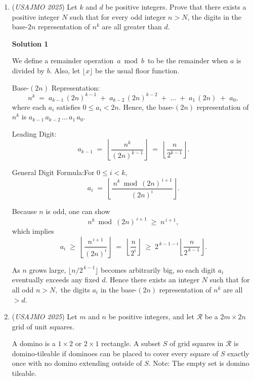 \begin{enumerate}
 Which is indeed not surjective and thus $g$ is not bijective.

 The proof is complete. $\square$



	\item (\textit{USAJMO 2025}) Let $k$ and $d$ be positive integers. Prove that there exists a positive integer $N$ such that for every odd integer $n>N$, the digits in the base-$2n$ representation of $n^k$ are all greater than $d$.


 



\textbf{Solution 1}

We define a remainder operation $\,a \bmod b\,$ to be the remainder when $a$ is divided by $b$. Also, let $\lfloor x\rfloor$ be the usual floor function.

 Base-$(2n)$ Representation:
 \[n^k \;=\; a_{k-1}\,(2n)^{k-1} \;+\; a_{k-2}\,(2n)^{k-2} \;+\;\dots\;+\;a_1\,(2n)\;+\;a_0,\]where each $a_i$ satisfies $0 \le a_i < 2n.$  Hence, the base-$(2n)$ representation of $n^k$ is $a_{k-1}\,a_{k-2}\,\dots\,a_1\,a_0.$

 Leading Digit:
 \[a_{k-1}  \;=\;  \left\lfloor  \dfrac{n^k}{(2n)^{k-1}} \right\rfloor \;=\; \left\lfloor \dfrac{n}{2^{k-1}} \right\rfloor.\]

 General Digit Formula:For $0 \le i < k,$
 \[a_i  \;=\; \left\lfloor  \dfrac{\,n^k \bmod (2n)^{\,i+1}}{(2n)^i} \right\rfloor.\]

 Because $n$ is odd, one can show 
 \[n^k \bmod (2n)^{\,i+1} \;\ge\; n^{\,i+1},\]which implies
 \[a_i  \;\ge\; \left\lfloor \dfrac{n^{\,i+1}}{(2n)^i} \right\rfloor \;=\; \left\lfloor \dfrac{n}{2^i} \right\rfloor \;\ge\; 2^{\,k-1-i} \left\lfloor \dfrac{n}{2^{\,k-1}} \right\rfloor.\]

 As $n$ grows large, $\bigl\lfloor n / 2^{\,k-1}\bigr\rfloor$  becomes arbitrarily big, so each digit $a_i$ eventually exceeds any fixed $d.$  Hence there exists an integer $N$ such that for all odd $n > N,$ the digits $a_i$ in the base-$(2n)$ representation of $n^k$ are all $> d.$



	\item (\textit{USAJMO 2025}) Let $m$ and $n$ be positive integers, and let $\mathcal R$ be a $2m\times 2n$ grid of unit squares.


 A domino is a $1\times2$ or $2\times1$ rectangle. A subset $S$ of grid squares in $\mathcal R$ is domino-tileable if dominoes can be placed to cover every square of $S$ exactly once with no domino extending outside of $S$. Note: The empty set is domino tileable.



\end{enumerate}
